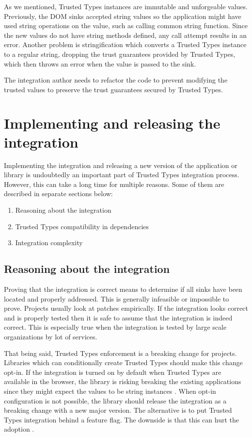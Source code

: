 As we mentioned, Trusted Types instances are immutable and unforgeable values. Previously, the DOM
sinks accepted string values so the application might have used string operations on the value, such
as calling common string function. Since the new values do not have string methods defined, any call
attempt results in an error. Another problem is stringification which converts a Trusted Types
instance to a regular string, dropping the trust guarantees provided by Trusted Types, which then
throws an error when the value is passed to the sink.

The integration author needs to refactor the code to prevent modifying the trusted values to
preserve the trust guarantees secured by Trusted Types.

\section{Implementing and releasing the integration}

Implementing the integration and releasing a new version of the application or library is
undoubtedly an important part of Trusted Types integration process. However, this can take a long
time for multiple reasons. Some of them are described in separate sections below:

\begin{enumerate}
  \item Reasoning about the integration
  \item Trusted Types compatibility in dependencies
  \item Integration complexity
\end{enumerate}

\subsection{Reasoning about the integration}
\label{sub:reason_about_integration}

Proving that the integration is correct means to determine if all sinks have been located and
properly addressed. This is generally infeasible or impossible to prove. Projects usually look at
patches empirically. If the integration looks correct and is properly tested then it is safe to
assume that the integration is indeed correct. This is especially true when the integration is
tested by large scale organizations by lot of services.

That being said, Trusted Types enforcement is a breaking change for projects. Libraries which can
conditionally create Trusted Types should make this change opt-in. If the integration is turned on
by default when Trusted Types are available in the browser, the library is risking breaking the
existing applications since they might expect the values to be string instances
\cite{dom_purify_breakage}. When opt-in configuration is not possible, the library should release
the integration as a breaking change with a new major version. The alternative is to put Trusted
Types integration behind a feature flag. The downside is that this can hurt the adoption
\cite{react_tt_feature_flag}.

